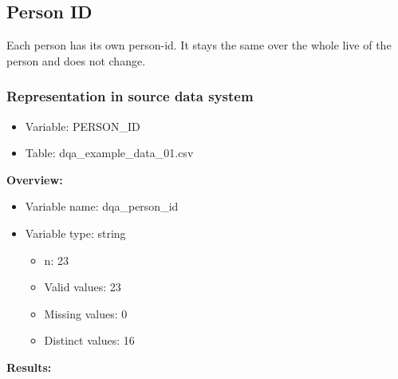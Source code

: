 \documentclass[
]{article}
\providecommand{\tightlist}{%
  \setlength{\itemsep}{0pt}\setlength{\parskip}{0pt}}
\begin{document}
\hypertarget{person-id}{%
\subsection{Person ID}\label{person-id}}

Each person has its own person-id. It stays the same over the whole live
of the person and does not change.

\hypertarget{representation-in-source-data-system-10}{%
\subsubsection{\texorpdfstring{Representation in \textbf{source} data
system}{Representation in source data system}}\label{representation-in-source-data-system-10}}

\begin{itemize}
\tightlist
\item
  Variable: PERSON\_ID
\item
  Table: dqa\_example\_data\_01.csv
\end{itemize}

\textbf{Overview:}

\begin{itemize}
\tightlist
\item
  Variable name: dqa\_person\_id
\item
  Variable type: string

  \begin{itemize}
  \tightlist
  \item
    n: 23
  \item
    Valid values: 23
  \item
    Missing values: 0
  \item
    Distinct values: 16
  \end{itemize}
\end{itemize}

\textbf{Results:}\\
\end{document}
